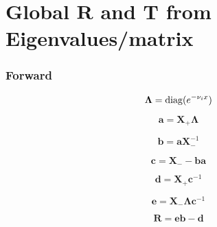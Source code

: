 %
\section{Global $\mathbf{R}$ and $\mathbf{T}$ from Eigenvalues/matrix}
\label{sec:global_r_and_t_from_eigenvalues_matrix}


\subsubsection{Forward}
\label{sec:global_r_and_t_from_eigenvalues_matrix-forward}

\begin{equation}
\mathbf{\Lambda} = \mathrm{diag}(e^{-\nu_{i}x})
\label{eq:global_r_and_t_from_eigenvalues_matrix-forward-Lambda}
\end{equation}

\begin{equation}
\mathbf{a} = \mathbf{X}_{+}\mathbf{\Lambda}
\label{eq:global_r_and_t_from_eigenvalues_matrix-forward-a}
\end{equation}

\begin{equation}
\mathbf{b} = \mathbf{a}\mathbf{X}^{-1}_{-}
\label{eq:global_r_and_t_from_eigenvalues_matrix-forward-b}
\end{equation}

\begin{equation}
\mathbf{c} = \mathbf{X}_{-} - \mathbf{b}\mathbf{a}
\label{eq:global_r_and_t_from_eigenvalues_matrix-forward-c}
\end{equation}

\begin{equation}
\mathbf{d} = \mathbf{X}_{+}\mathbf{c}^{-1}
\label{eq:global_r_and_t_from_eigenvalues_matrix-forward-d}
\end{equation}

\begin{equation}
\mathbf{e} = \mathbf{X}_{-}\mathbf{\Lambda}\mathbf{c}^{-1}
\label{eq:global_r_and_t_from_eigenvalues_matrix-forward-e}
\end{equation}

\begin{equation}
\mathbf{R} = \mathbf{e}\mathbf{b} - \mathbf{d}
\label{eq:global_r_and_t_from_eigenvalues_matrix-forward-R}
\end{equation}

